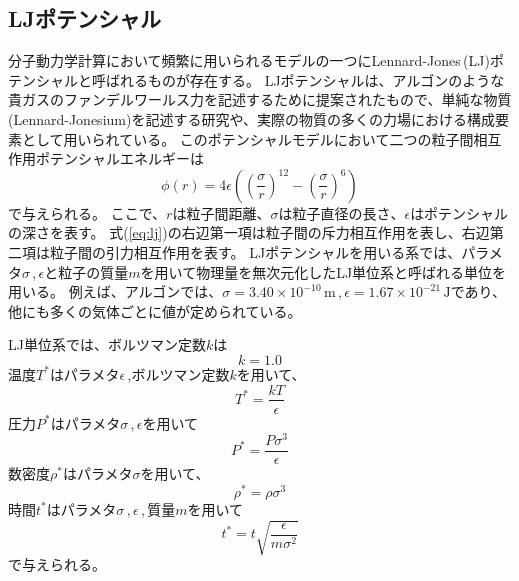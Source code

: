 \documentclass[titlepage]{jsreport}
\begin{document}
\subsection{LJポテンシャル}\label{principle-subsec:LJ}
分子動力学計算において頻繁に用いられるモデルの一つにLennard-Jones\,(LJ)ポテンシャルと呼ばれるものが存在する。
LJポテンシャルは、アルゴンのような貴ガスのファンデルワールス力を記述するために提案された\cite{lennard-jones}もので、単純な物質(Lennard-Jonesium)を記述する研究\cite{lennard-jonesium-1,lennard-jonesium-2}や、実際の物質の多くの力場における構成要素\cite{lennard-jones-force-field-1,lennard-jones-force-field-2, lennard-jones-force-field-3}として用いられている。
このポテンシャルモデルにおいて二つの粒子間相互作用ポテンシャルエネルギーは
\large
\begin{equation}
\phi(r)=4{\epsilon}\left(\left(\frac{\sigma}{r}\right)^{12}-\left(\frac{\sigma}{r}\right)^6\right)\label{eq:lj}
\end{equation}
\normalsize
で与えられる。
ここで、$r$は粒子間距離、${\sigma}$は粒子直径の長さ、${\epsilon}$はポテンシャルの深さを表す。
式(\ref{eq:lj})の右辺第一項は粒子間の斥力相互作用を表し、右辺第二項は粒子間の引力相互作用を表す。
LJポテンシャルを用いる系では、パラメタ$\sigma$\,,\,$\epsilon$と粒子の質量$m$を用いて物理量を無次元化したLJ単位系と呼ばれる単位を用いる。
例えば、アルゴンでは、${\sigma}=3.40×10^{-10}\,\mathrm{m}$\,,\,${\epsilon}=1.67×10^{-21}\,\mathrm{J}$であり\cite{lennard-jones-argon-parameters}、
他にも多くの気体ごとに値が定められている\cite{lennard-jones-many-parameters}。

LJ単位系では、ボルツマン定数$k$は
\large
\begin{equation}
k=1.0\label{eq:k}
\end{equation}
\normalsize
温度$T^*$はパラメタ$\epsilon$\,,ボルツマン定数$k$を用いて、
\large
\begin{equation}
T^*=\frac{kT}{\epsilon}\label{eq:T}
\end{equation}
\normalsize
圧力$P^*$はパラメタ${\sigma}$\,,\,${\epsilon}$を用いて
\large
\begin{equation}
P^*=\frac{P\sigma^3}{\epsilon}\label{eq:P}
\end{equation}
\normalsize
数密度$\rho^*$はパラメタ$\sigma$を用いて、
\large
\begin{equation}
\rho^*=\rho{\sigma}^3\label{eq:rho}
\end{equation}
\normalsize
時間$t^*$はパラメタ${\sigma}$\,,\,${\epsilon}$\,,\,質量$m$を用いて
\large
\begin{equation}
t^*=t\sqrt{\frac{\epsilon}{m{\sigma}^2}}\label{eq:time}
\end{equation}
\normalsize
で与えられる。
\end{document}
